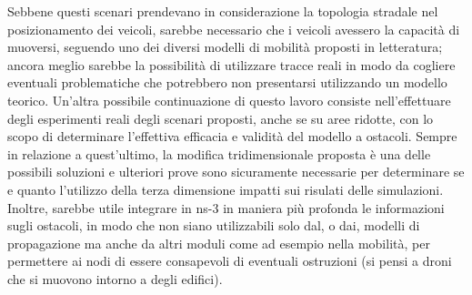 Sebbene questi scenari prendevano in considerazione la topologia stradale nel posizionamento dei veicoli,
sarebbe necessario che i veicoli avessero la capacità di muoversi, seguendo uno dei diversi modelli di mobilità
proposti in letteratura;
ancora meglio sarebbe la possibilità di utilizzare tracce reali in modo da cogliere eventuali problematiche
che potrebbero non presentarsi utilizzando un modello teorico.
Un'altra possibile continuazione di questo lavoro consiste nell'effettuare degli esperimenti reali
degli scenari proposti, anche se su aree ridotte, con lo scopo di determinare l'effettiva efficacia e
validità del modello a ostacoli.
Sempre in relazione a quest'ultimo, la modifica tridimensionale proposta è una delle
possibili soluzioni e ulteriori prove sono sicuramente necessarie per determinare
se e quanto l'utilizzo della terza dimensione impatti sui risulati delle simulazioni.
Inoltre, sarebbe utile integrare in ns-3 in maniera più profonda le informazioni sugli ostacoli,
in modo che non siano utilizzabili solo dal, o dai, modelli di propagazione ma anche
da altri moduli come ad esempio nella mobilità, per permettere ai nodi di essere consapevoli di eventuali ostruzioni
(si pensi a droni che si muovono intorno a degli edifici).
